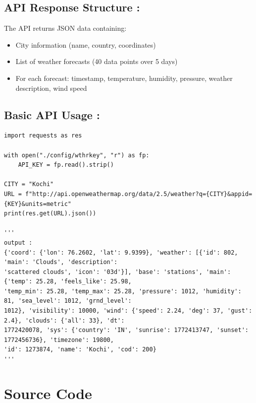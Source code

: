 \documentclass[a4paper]{article}
\begin{document}
\subsection*{API Response Structure :}
The API returns JSON data containing:
\begin{itemize}
    \item City information (name, country, coordinates)
    \item List of weather forecasts (40 data points over 5 days)
    \item For each forecast: timestamp, temperature, humidity, pressure, weather description, wind speed
\end{itemize}

\subsection*{Basic API Usage :}
\begin{verbatim}
import requests as res

with open("./config/wthrkey", "r") as fp:
    API_KEY = fp.read().strip()

CITY = "Kochi"
URL = f"http://api.openweathermap.org/data/2.5/weather?q={CITY}&appid={KEY}&units=metric"
print(res.get(URL).json())

''' 
output :
{'coord': {'lon': 76.2602, 'lat': 9.9399}, 'weather': [{'id': 802, 'main': 'Clouds', 'description':
'scattered clouds', 'icon': '03d'}], 'base': 'stations', 'main': {'temp': 25.28, 'feels_like': 25.98,
'temp_min': 25.28, 'temp_max': 25.28, 'pressure': 1012, 'humidity': 81, 'sea_level': 1012, 'grnd_level':
1012}, 'visibility': 10000, 'wind': {'speed': 2.24, 'deg': 37, 'gust': 2.4}, 'clouds': {'all': 33}, 'dt':
1772420078, 'sys': {'country': 'IN', 'sunrise': 1772413747, 'sunset': 1772456736}, 'timezone': 19800,
'id': 1273874, 'name': 'Kochi', 'cod': 200}
'''
\end{verbatim}

\vspace{20pt}

\section*{Source Code}
\end{document}
